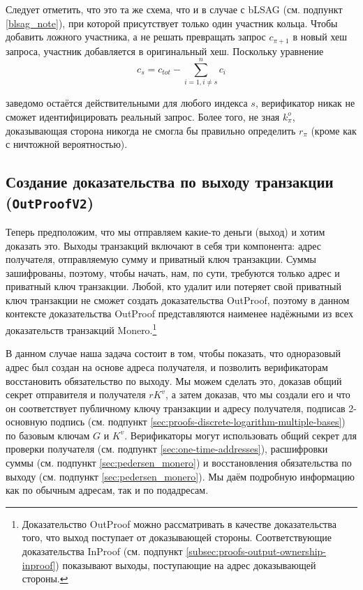 Следует отметить, что это та же схема, что и в случае с bLSAG (см. подпункт \ref{blsag_note}), при которой присутствует только один участник кольца. Чтобы добавить ложного участника, а не решать превращать запрос $c_{\pi+1}$ в новый хеш запроса, участник добавляется в оригинальный хеш. Поскольку уравнение\vspace{.175cm}
\[c_{s} = c_{tot} - \sum^{n}_{i=1,i\neq s} c_i\]

заведомо остаётся действительными для любого  индекса $s$, верификатор никак не сможет идентифицировать реальный запрос. Более того, не зная $k^o_{\pi}$, доказывающая сторона никогда не смогла бы правильно определить $r_{\pi}$ (кроме как с ничтожной вероятностью).


\subsection{Создание доказательства по выходу транзакции ({\tt OutProofV2})}
\label{subsec:proofs-output-creator-outproof}

Теперь предположим, что мы отправляем какие-то деньги (выход) и хотим доказать это. Выходы транзакций включают в себя три компонента: адрес получателя, отправляемую сумму и приватный ключ транзакции. Суммы зашифрованы, поэтому, чтобы начать, нам, по сути, требуются только адрес и приватный ключ транзакции. Любой, кто удалит или потеряет свой приватный ключ транзакции не сможет создать доказательства OutProof, поэтому в данном контексте доказательства OutProof представляются наименее надёжными из всех доказательств транзакций Monero.\footnote{Доказательство OutProof можно рассматривать в качестве доказательства того, что выход поступает от доказывающей стороны. Соответствующие доказательства InProof (см. подпункт \ref{subsec:proofs-output-ownership-inproof}) показывают выходы, поступающие на адрес доказывающей стороны.}

В данном случае наша задача состоит в том, чтобы показать, что одноразовый адрес был создан на основе адреса получателя, и позволить верификаторам восстановить обязательство по выходу. Мы можем сделать это, доказав общий секрет отправителя и получателя $rK^v$, а затем доказав, что мы создали его и что он соответствует публичному ключу транзакции и адресу получателя, подписав 2-основную подпись (см. подпункт \ref{sec:proofs-discrete-logarithm-multiple-bases}) по базовым ключам $G$ и $K^v$. Верификаторы могут использовать общий секрет для проверки получателя (см. подпункт \ref{sec:one-time-addresses}), расшифровки суммы (см. подпункт \ref{sec:pedersen_monero}) и восстановления обязательства по выходу (см. подпункт \ref{sec:pedersen_monero}). Мы даём подробную информацию как по обычным адресам, так и по подадресам.


